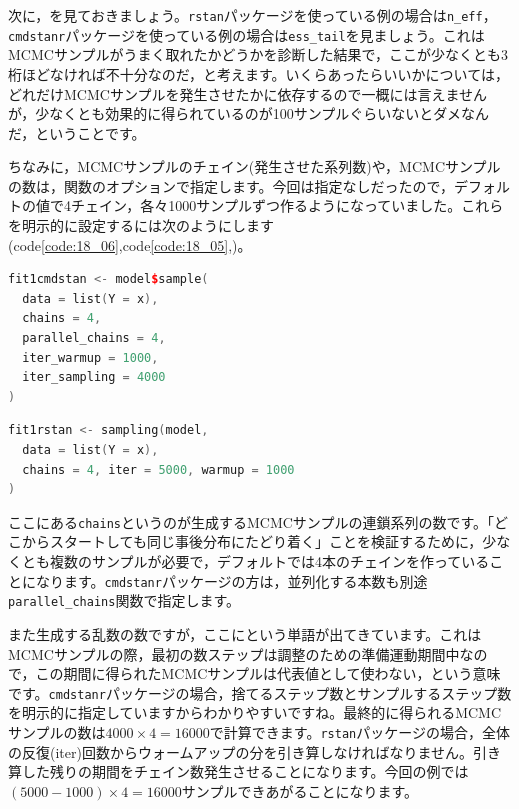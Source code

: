 \documentclass{ltjsbook}
\begin{document}
次に，を見ておきましょう。\texttt{rstan}パッケージを使っている例の場合は\verb|n_eff|，\texttt{cmdstanr}パッケージを使っている例の場合は\verb|ess_tail|を見ましょう。これはMCMCサンプルがうまく取れたかどうかを診断した結果で，ここが少なくとも3桁ほどなければ不十分なのだ，と考えます。いくらあったらいいかについては，どれだけMCMCサンプルを発生させたかに依存するので一概には言えませんが，少なくとも効果的に得られているのが100サンプルぐらいないとダメなんだ，ということです。

ちなみに，MCMCサンプルのチェイン(発生させた系列数)や，MCMCサンプルの数は，関数のオプションで指定します。今回は指定なしだったので，デフォルトの値で4チェイン，各々1000サンプルずつ作るようになっていました。これらを明示的に設定するには次のようにします(code\ref{code:18_06},code\ref{code:18_05},)。

\begin{lstlisting}[language=C++,label={code:18_06},caption={cmdstanrパッケージによるオプション指定}]
fit1cmdstan <- model$sample(
  data = list(Y = x),
  chains = 4,
  parallel_chains = 4,
  iter_warmup = 1000,
  iter_sampling = 4000
)
\end{lstlisting}


\begin{lstlisting}[language=C++,label={code:18_05},caption={rstanパッケージによるオプション指定}]
fit1rstan <- sampling(model,
  data = list(Y = x),
  chains = 4, iter = 5000, warmup = 1000
)
\end{lstlisting}

ここにある\texttt{chains}というのが生成するMCMCサンプルの連鎖系列の数です。「どこからスタートしても同じ事後分布にたどり着く」ことを検証するために，少なくとも複数のサンプルが必要で，デフォルトでは4本のチェインを作っていることになります。\texttt{cmdstanr}パッケージの方は，並列化する本数も別途\verb|parallel_chains|関数で指定します。

また生成する乱数の数ですが，ここにという単語が出てきています。これはMCMCサンプルの際，最初の数ステップは調整のための準備運動期間中なので，この期間に得られたMCMCサンプルは代表値として使わない，という意味です。\texttt{cmdstanr}パッケージの場合，捨てるステップ数とサンプルするステップ数を明示的に指定していますからわかりやすいですね。最終的に得られるMCMCサンプルの数は$4000\times 4=16000$で計算できます。\texttt{rstan}パッケージの場合，全体の反復(iter)回数からウォームアップの分を引き算しなければなりません。引き算した残りの期間をチェイン数発生させることになります。今回の例では$(5000-1000)\times 4=16000$サンプルできあがることになります。
\end{document}

